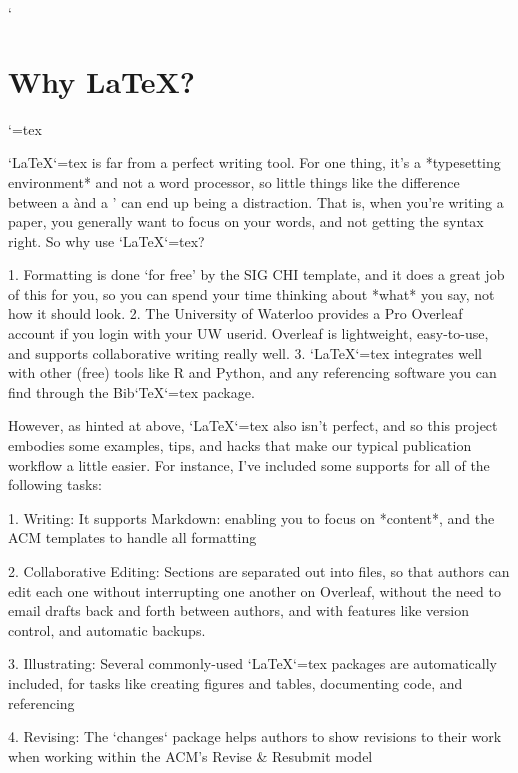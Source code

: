 %
%


\begin{markdown}

`\section{Why \LaTeX?}`{=tex}

`\LaTeX{}`{=tex} is far from a perfect writing tool. For one thing, it's a *typesetting environment* and not a word processor, so little things like the difference between a \` and a ' can end up being a distraction. That is, when you're writing a paper, you generally want to focus on your words, and not getting the syntax right. So why use `\LaTeX{}`{=tex}?

1. Formatting is done ‘for free’ by the SIG CHI template, and it does a great job of this for you, so you can spend your time thinking about *what* you say, not how it should look.
2. The University of Waterloo provides a Pro Overleaf account if you login with your UW userid. Overleaf is lightweight, easy-to-use, and supports collaborative writing really well. 
3. `\LaTeX{}`{=tex} integrates well with other (free) tools like R and Python, and any referencing software you can find through the Bib`\TeX{}`{=tex} package.

However, as hinted at above, `\LaTeX{}`{=tex} also isn't perfect, and so this project embodies some examples, tips, and hacks that make our typical publication workflow a little easier. For instance, I've included some supports for all of the following tasks:

1. Writing: It supports Markdown: enabling you to focus on *content*, and the ACM templates to handle all formatting

2. Collaborative Editing: Sections are separated out into files, so that authors can edit each one without interrupting one another on Overleaf, without the need to email drafts back and forth between authors, and with features like version control, and automatic backups. 

3. Illustrating: Several commonly-used `\LaTeX{}`{=tex} packages are automatically included, for tasks like creating figures and tables, documenting code, and referencing

4. Revising: The `changes` package helps authors to show revisions to their work when working within the ACM's Revise & Resubmit model


\end{markdown}
